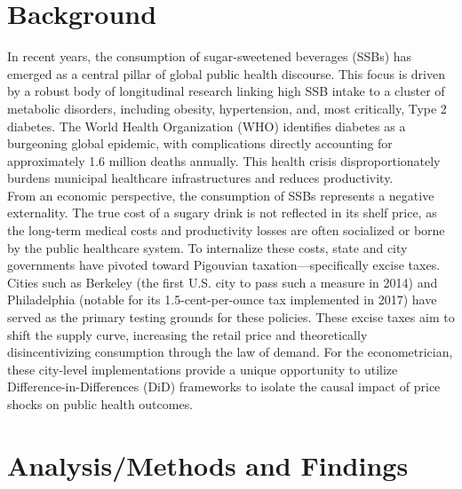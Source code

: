 \documentclass[12pt, a4paper]{article}
\begin{document}
\section{Background}
In recent years, the consumption of sugar-sweetened beverages (SSBs) has emerged as a central pillar of global public health discourse. This focus is driven by a robust body of longitudinal research linking high SSB intake to a cluster of metabolic disorders, including obesity, hypertension, and, most critically, Type 2 diabetes. The World Health Organization (WHO) identifies diabetes as a burgeoning global epidemic, with complications directly accounting for approximately 1.6 million deaths annually. This health crisis disproportionately burdens municipal healthcare infrastructures and reduces productivity.
\\
From an economic perspective, the consumption of SSBs represents a negative externality. The true cost of a sugary drink is not reflected in its shelf price, as the long-term medical costs and productivity losses are often socialized or borne by the public healthcare system. To internalize these costs, state and city governments have pivoted toward Pigouvian taxation—specifically excise taxes.
\\
Cities such as Berkeley (the first U.S. city to pass such a measure in 2014) and Philadelphia (notable for its 1.5-cent-per-ounce tax implemented in 2017) have served as the primary testing grounds for these policies. These excise taxes aim to shift the supply curve, increasing the retail price and theoretically disincentivizing consumption through the law of demand. For the econometrician, these city-level implementations provide a unique opportunity to utilize Difference-in-Differences (DiD) frameworks to isolate the causal impact of price shocks on public health outcomes.


\section{Analysis/Methods and Findings}
\end{document}
